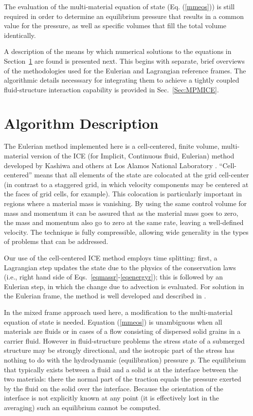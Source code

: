 The evaluation of the multi-material equation of state (Eq. (\ref{mmeos})) is still required in order to determine an equilibrium pressure that results in a common value for the  pressure, as well as specific volumes that fill the total volume identically.

A description of the means by which numerical solutions to the equations in Section~\ref{sec:ICE:algorithm} are found is presented next.  This begins with separate, brief overviews of the methodologies used for the Eulerian and Lagrangian reference frames.  The algorithmic details necesssary for integrating them to achieve a tightly coupled fluid-structure interaction capability is provided in Sec.~\ref{Sec:MPMICE}.

\section{Algorithm Description}\label{sec:ICE:algorithm}

The Eulerian method implemented here is a cell-centered, finite volume, multi-material version of the ICE (for Implicit, Continuous fluid, Eulerian) method \cite{harlowamsden68} developed by Kashiwa and others at Los Alamos National Laboratory \cite{kashiwaCCICE94}.  ``Cell-centered'' means that all elements of the state are colocated at the grid cell-center (in contrast to a staggered grid, in which velocity components may be centered at the faces of grid cells, for example).  This colocation is particularly important in regions where a material mass is vanishing.  By using the same control volume for mass and momentum it can be assured that as the material mass goes to zero, the mass and momentum also go to zero at the same rate, leaving a well-defined velocity.  The technique is fully compressible, allowing wide generality in the types of problems that can be addressed.
 
Our use of the cell-centered ICE method employs time splitting: first, a Lagrangian step updates the state due to the physics of the conservation laws (i.e., right hand side of Eqs.~{\ref{eqmassr}-\ref{eqenergyr}}); this is followed by an Eulerian step, in which the change due to advection is evaluated.  For solution in the Eulerian frame, the method is well developed and described in \cite{kashiwaCCICE94}.

In the mixed frame approach used here, a modification to the multi-material equation of state is needed.  Equation (\ref{mmeos}) is unambiguous when all materials are fluids or in cases of a flow consisting of dispersed solid grains in a carrier fluid.  However in fluid-structure problems the stress state of a submerged structure may be strongly directional, and the isotropic part of the stress has nothing to do with the hydrodynamic (equilibration) pressure $p$.  The equilibrium that typically exists between a fluid and a solid is at the interface between the two materials: there the normal part of the traction equals the pressure exerted by the fluid on the solid over the interface.  Because the orientation of the interface is not explicitly known at any point (it is effectively lost in the averaging) such an equilibrium cannot be computed.

